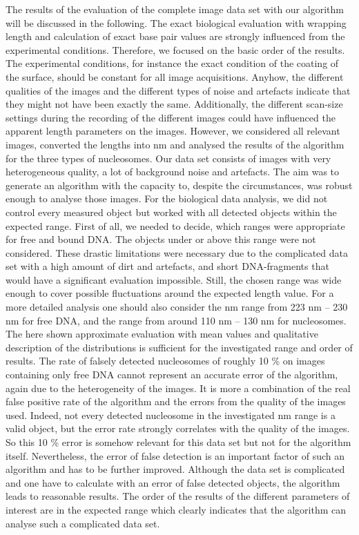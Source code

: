 \documentclass{article}
\begin{document}
The results of the evaluation of the complete image data set with our algorithm will be discussed in the following. 
The exact biological evaluation with wrapping length and calculation of exact base pair values are strongly influenced from the experimental conditions. Therefore, we focused on the basic order of the results. The experimental conditions, for instance the exact condition of the coating of the surface, should be constant for all image acquisitions. Anyhow, the different qualities of the images and the different types of noise and artefacts indicate that they might not have been exactly the same. Additionally, the different scan-size settings during the recording of the different images could have influenced the apparent length parameters on the images. However, we considered all relevant images, converted the lengths into nm and analysed the results of the algorithm for the three types of nucleosomes.
Our data set consists of images with very heterogeneous quality, a lot of background noise and artefacts. The aim was to generate an algorithm with the capacity to, despite the circumstances, was robust enough to analyse those images. For the biological data analysis, we did not control every measured object but worked with all detected objects within the expected range. 
First of all, we needed to decide, which ranges were appropriate for free and bound DNA. The objects under or above this range were not considered. These drastic limitations were necessary due to the complicated data set with a high amount of dirt and artefacts, and short DNA-fragments that would have a significant evaluation impossible. Still, the chosen range was wide enough to cover possible fluctuations around the expected length value. For a more detailed analysis one should also consider the nm range from 223 nm – 230 nm for free DNA, and the range from around 110 nm – 130 nm for nucleosomes. The here shown approximate evaluation with mean values and qualitative description of the distributions is sufficient for the investigated range and order of results.
The rate of falsely detected nucleosomes of roughly 10 \% on images containing only free DNA cannot represent an accurate error of the algorithm, again due to the heterogeneity of the images. It is more a combination of the real false positive rate of the algorithm and the errors from the quality of the images used. Indeed, not every detected nucleosome in the investigated nm range is a valid object, but the error rate strongly correlates with the quality of the images. So this 10 \% error is somehow relevant for this data set but not for the algorithm itself. Nevertheless, the error of false detection is an important factor of such an algorithm and has to be further improved. Although the data set is complicated and one have to calculate with an error of false detected objects, the algorithm leads to reasonable results. The order of the results of the different parameters of interest are in the expected range which clearly indicates that the algorithm can analyse such a complicated data set. 
\end{document}
